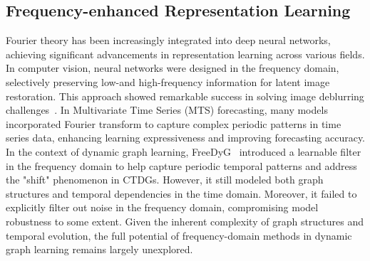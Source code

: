  





\subsection{Frequency-enhanced Representation Learning}  
Fourier theory has been increasingly integrated into deep neural networks, achieving significant advancements in representation learning across various fields. In computer vision, neural networks were designed in the frequency domain, selectively preserving low-and high-frequency information for latent image restoration. This approach showed remarkable success in solving image deblurring challenges~\cite{kong2023efficient}. In Multivariate Time Series (MTS) forecasting, many models~\cite{zhang2017stock,yang2020adaptive,zhou2022fedformer,DBLP:conf/icml/Eldele0C0024} incorporated Fourier transform to capture complex periodic patterns in time series data, enhancing learning expressiveness and improving forecasting accuracy. In the context of dynamic graph learning, FreeDyG~\cite{tian2023freedyg} introduced a learnable filter in the frequency domain to help capture periodic temporal patterns and address the "shift" phenomenon in CTDGs. However, it still modeled both graph structures and temporal dependencies in the time domain. Moreover, it failed to explicitly filter out noise in the frequency domain, compromising model robustness to some extent. Given the inherent complexity of graph structures and temporal evolution, the full potential of frequency-domain methods in dynamic graph learning remains largely unexplored.



